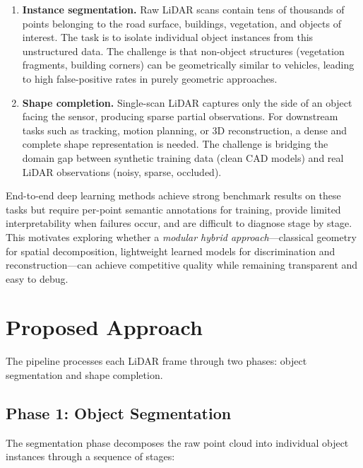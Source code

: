 \documentclass[runningheads]{llncs}
\begin{document}
\begin{enumerate}
    \item \textbf{Instance segmentation.} Raw LiDAR scans contain tens of thousands of points belonging to the road surface, buildings, vegetation, and objects of interest. The task is to isolate individual object instances from this unstructured data. The challenge is that non-object structures (vegetation fragments, building corners) can be geometrically similar to vehicles, leading to high false-positive rates in purely geometric approaches.

    \item \textbf{Shape completion.} Single-scan LiDAR captures only the side of an object facing the sensor, producing sparse partial observations. For downstream tasks such as tracking, motion planning, or 3D reconstruction, a dense and complete shape representation is needed. The challenge is bridging the domain gap between synthetic training data (clean CAD models) and real LiDAR observations (noisy, sparse, occluded).
\end{enumerate}

End-to-end deep learning methods achieve strong benchmark results on these tasks but require per-point semantic annotations for training, provide limited interpretability when failures occur, and are difficult to diagnose stage by stage. This motivates exploring whether a \emph{modular hybrid approach}---classical geometry for spatial decomposition, lightweight learned models for discrimination and reconstruction---can achieve competitive quality while remaining transparent and easy to debug.


\section{Proposed Approach}

The pipeline processes each LiDAR frame through two phases: object segmentation and shape completion.

\subsection{Phase 1: Object Segmentation}

The segmentation phase decomposes the raw point cloud into individual object instances through a sequence of stages:
\end{document}
